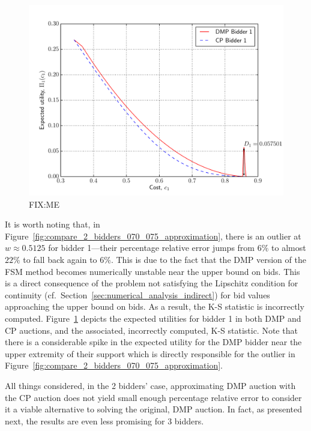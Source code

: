 \begin{figure}[p!]
  \includegraphics[width=\figsize]{Approximation/Figures/compare_2_bidders_070_075_outlier}
  \caption{FIX:ME}
  \label{fig:compare_2_bidders_070_075_outlier_approximation}
\end{figure}

It is worth noting that, in Figure~\ref{fig:compare_2_bidders_070_075_approximation}, there is an outlier at $w\approx 0.5125$ for bidder 1---their percentage relative error jumps from $6\%$ to almost $22\%$ to fall back again to $6\%$. This is due to the fact that the DMP version of the FSM method becomes numerically unstable near the upper bound on bids. This is a direct consequence of the problem not satisfying the Lipschitz condition for continuity (cf.~Section~\ref{sec:numerical_analysis_indirect}) for bid values approaching the upper bound on bids. As a result, the K-S statistic is incorrectly computed. Figure~\ref{fig:compare_2_bidders_070_075_outlier_approximation} depicts the expected utilities for bidder 1 in both DMP and CP auctions, and the associated, incorrectly computed, K-S statistic. Note that there is a considerable spike in the expected utility for the DMP bidder near the upper extremity of their support which is directly responsible for the outlier in Figure~\ref{fig:compare_2_bidders_070_075_approximation}.

All things considered, in the 2 bidders' case, approximating DMP auction with the CP auction does not yield small enough percentage relative error to consider it a viable alternative to solving the original, DMP auction. In fact, as presented next, the results are even less promising for 3 bidders.

